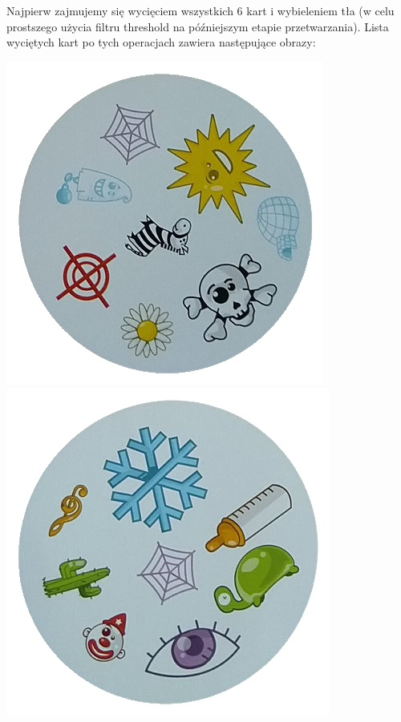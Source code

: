\documentclass[10pt,a4paper]{article}
\begin{document}
Najpierw zajmujemy się wycięciem wszystkich 6 kart i wybieleniem tła (w celu prostszego użycia filtru threshold na późniejszym etapie przetwarzania). Lista wyciętych kart po tych operacjach zawiera następujące obrazy:\\
\begin{center}
\includegraphics[scale=0.25]{2.1/card0.jpg}
\includegraphics[scale=0.25]{2.1/card1.jpg}

\end{center}
\end{document}
